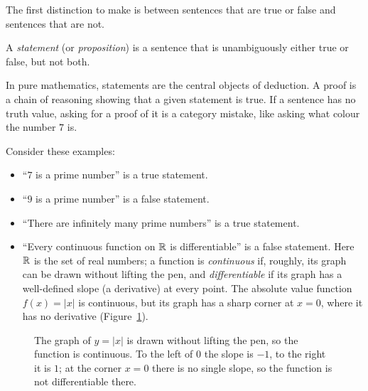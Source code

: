 The first distinction to make is between sentences that are true or false and sentences that are not.

\begin{definition}
A \emph{statement} (or \emph{proposition}) is a sentence that is unambiguously either true or false, but not both.
\end{definition}

In pure mathematics, statements are the central objects of deduction. A proof is a chain of reasoning showing that a given statement is true. If a sentence has no truth value, asking for a proof of it is a category mistake, like asking what colour the number $7$ is.

Consider these examples:
\begin{itemize}
\item ``$7$ is a prime number'' is a true statement.
\item ``$9$ is a prime number'' is a false statement.
\item ``There are infinitely many prime numbers'' is a true statement.
\item ``Every continuous function on $\mathbb{R}$ is differentiable'' is a false statement. Here $\mathbb{R}$ is the set of real numbers; a function is \emph{continuous} if, roughly, its graph can be drawn without lifting the pen, and \emph{differentiable} if its graph has a well-defined slope (a derivative) at every point. The absolute value function $f(x) = \lvert x\rvert$ is continuous, but its graph has a sharp corner at $x = 0$, where it has no derivative (Figure~\ref{02:fig-abs-corner}).
\end{itemize}

\begin{figure}[htbp]
\centering
{}
\caption{The graph of $y = \lvert x\rvert$ is drawn without lifting the pen, so the function is continuous. To the left of $0$ the slope is $-1$, to the right it is $1$; at the corner $x = 0$ there is no single slope, so the function is not differentiable there.}
\label{02:fig-abs-corner}
\end{figure}

